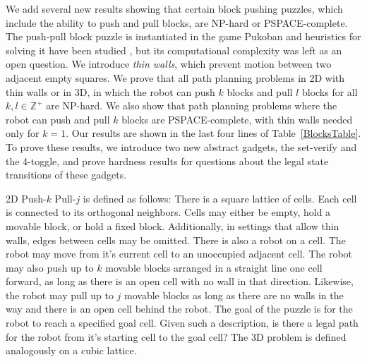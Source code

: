 We add several new results showing that certain block pushing puzzles, which include the ability to push and pull blocks, are NP-hard or PSPACE-complete. The push-pull block puzzle is instantiated in the game Pukoban and heuristics for solving it have been studied \cite{zubaranagent}, but its computational complexity was left as an open question.
We introduce \emph{thin walls}, which prevent motion between two adjacent empty squares. We prove that all path planning problems in 2D with thin walls or in 3D, in which the robot can push $k$ blocks and pull $l$ blocks for all $k,l \in \mathbb{Z}^+$ are NP-hard. We also show that path planning problems where the robot can push and pull $k$ blocks are PSPACE-complete, with thin walls needed only for $k=1$. Our results are shown in the last four lines of Table~\ref{BlocksTable}. To prove these results, we introduce two new abstract gadgets, the set-verify and the 4-toggle, and prove hardness results for questions about the legal state transitions of these gadgets. %


2D Push-$k$ Pull-$j$ is defined as follows: There is a square lattice of cells. Each cell is connected to its orthogonal neighbors. Cells may either be empty, hold a movable block, or hold a fixed block. Additionally, in settings that allow thin walls, edges between cells may be omitted. There is also a robot on a cell. The robot may move from it's current cell to an unoccupied adjacent cell. The robot may also push up to $k$ movable blocks arranged in a straight line one cell forward, as long as there is an open cell with no wall in that direction. Likewise, the robot may pull up to $j$ movable blocks as long as there are no walls in the way and there is an open cell behind the robot. The goal of the puzzle is for the robot to reach a specified goal cell. Given such a description, is there a legal path for the robot from it's starting cell to the goal cell? The 3D problem is defined analogously on a cubic lattice.

